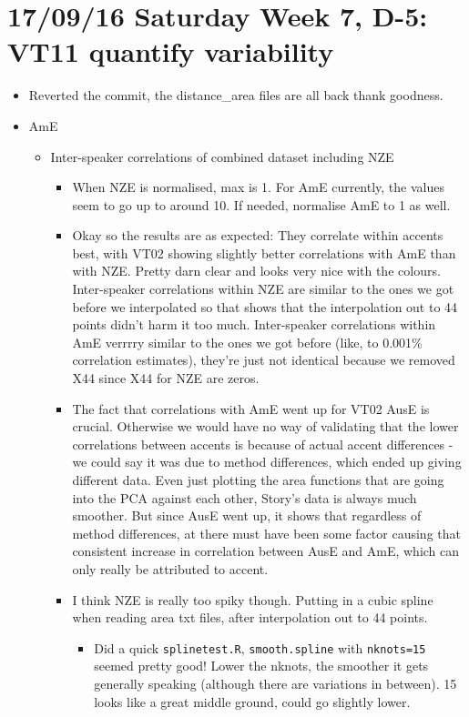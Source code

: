 \documentclass{article}
\begin{document}
\section*{17/09/16 Saturday Week 7, D-5: VT11 quantify variability}
\begin{itemize}
    \item Reverted the commit, the distance\_area files are all back thank goodness.
    \item AmE
    \begin{itemize}
        \item Inter-speaker correlations of combined dataset including NZE
        \begin{itemize}
            \item When NZE is normalised, max is 1. For AmE currently, the values seem to go up to around 10. If needed, normalise AmE to 1 as well.
            \item Okay so the results are as expected: They correlate within accents best, with VT02 showing slightly better correlations with AmE than with NZE. Pretty darn clear and looks very nice with the colours. Inter-speaker correlations within NZE are similar to the ones we got before we interpolated so that shows that the interpolation out to 44 points didn't harm it too much. Inter-speaker correlations within AmE verrrry similar to the ones we got before (like, to 0.001\% correlation estimates), they're just not identical because we removed X44 since X44 for NZE are zeros. 
            \item The fact that correlations with AmE went up for VT02 AusE is crucial. Otherwise we would have no way of validating that the lower correlations between accents is because of actual accent differences - we could say it was due to method differences, which ended up giving different data. Even just plotting the area functions that are going into the PCA against each other, Story's data is always much smoother. But since AusE went up, it shows that regardless of method differences, at there must have been some factor causing that consistent increase in correlation between AusE and AmE, which can only really be attributed to accent.
            \item I think NZE is really too spiky though. Putting in a cubic spline when reading area txt files, after interpolation out to 44 points.
            \begin{itemize}
                \item Did a quick \verb|splinetest.R|, \verb|smooth.spline| with \verb|nknots=15| seemed pretty good! Lower the nknots, the smoother it gets generally speaking (although there are variations in between). 15 looks like a great middle ground, could go slightly lower.

\end{itemize}
\end{itemize}
\end{itemize}
\end{itemize}
\end{document}
